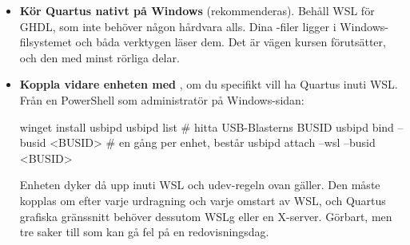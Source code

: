 \begin{itemize}
  \item \textbf{Kör Quartus nativt på Windows} (rekommenderas). Behåll WSL för GHDL, som inte behöver
    någon hårdvara alls. Dina -filer ligger i Windows-filsystemet och båda verktygen läser
    dem. Det är vägen kursen förutsätter, och den med minst rörliga delar.
  \item \textbf{Koppla vidare enheten med }, om du specifikt vill ha Quartus inuti
    WSL. Från en PowerShell som administratör på Windows-sidan:

\begin{console}
winget install usbipd
usbipd list                      # hitta USB-Blasterns BUSID
usbipd bind   --busid <BUSID>    # en gång per enhet, består
usbipd attach --wsl --busid <BUSID>
\end{console}

    Enheten dyker då upp inuti WSL och udev-regeln ovan gäller. Den måste kopplas om efter varje
    urdragning och varje omstart av WSL, och Quartus grafiska gränssnitt behöver dessutom WSLg eller
    en X-server. Görbart, men tre saker till som kan gå fel på en redovisningsdag.
\end{itemize}
